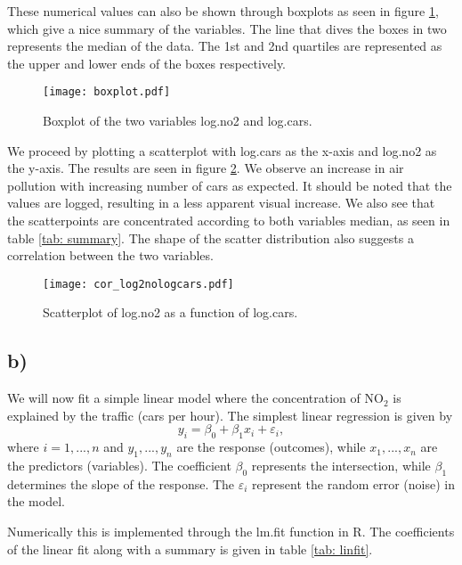 \documentclass[a4paper, 10pt, reqno]{amsart}
\begin{document}
These numerical values can also be shown through boxplots as seen in figure \ref{fig: boxplot}, which give a nice summary of the variables. The line that dives the boxes in two represents the median of the data. The 1st and 2nd quartiles are represented as the upper and lower ends of the boxes respectively.

\begin{figure}
    \centering
    \texttt{[image: boxplot.pdf]}
    \caption{Boxplot of the two variables log.no2 and log.cars.}
    \label{fig: boxplot}
\end{figure}

We proceed by plotting a scatterplot with log.cars as the x-axis and log.no2 as the y-axis. The results are seen in figure \ref{fig: log.no2log.cars}. We observe an increase in air pollution with increasing number of cars as expected. It should be noted that the values are logged, resulting in a less apparent visual increase. We also see that the scatterpoints are concentrated according to both variables median, as seen in table \ref{tab: summary}. The shape of the scatter distribution also suggests a correlation between the two variables.

\begin{figure}[h]
    \centering
    \texttt{[image: cor\_log2nologcars.pdf]}
    \caption{Scatterplot of log.no2 as a function of log.cars.}
    \label{fig: log.no2log.cars}
\end{figure}

\subsection{b)}
We will now fit a simple linear model where the concentration of NO$_2$ is explained by the traffic (cars per hour). The simplest linear regression is given by
\begin{equation}\label{eq: linreq}
    y_i = \beta_0 + \beta_1 x_i + \varepsilon_i,
\end{equation}
where $i = 1,...,n$ and $y_1,...,y_n$ are the response (outcomes), while $x_1,...,x_n$ are the predictors (variables). The coefficient $\beta_0$ represents the intersection, while $\beta_1$ determines the slope of the response. The $\varepsilon_i$ represent the random error (noise) in the model.

Numerically this is implemented through the lm.fit function in R. The coefficients of the linear fit along with a summary is given in table \ref{tab: linfit}.
\end{document}
